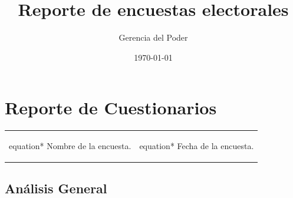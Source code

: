 \documentclass[10,a4paperpaper,]{article}
\title{Reporte de encuestas electorales}
\author{Gerencia del Poder}
\date{\today}
\begin{document}
\renewcommand{\contentsname}{Gerencia del Poder}

\renewcommand{\pagename}{Página}


\maketitle
\tableofcontents
{}
\clearpage

\section*{Reporte de Cuestionarios}

\begin{center}
  \begin{tabular}{ c  c }
    \begin{mybox}[colback=white, width = 7cm]{equation*}
      Nombre de la encuesta.
    \end{mybox}
    & 
    \begin{mybox}[colback=white, width = 7cm]{equation*}
      Fecha de la encuesta.
    \end{mybox}
  \end{tabular}
\end{center}

\subsection{Análisis General}
\end{document}
